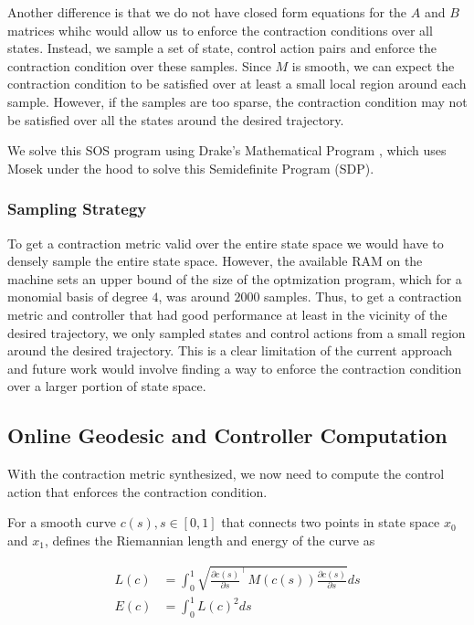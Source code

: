 \documentclass[conference]{IEEEtran}
\begin{document}
Another difference is that we do not have closed form equations for the $A$ and $B$ matrices whihc would allow us to enforce the contraction conditions over all states. Instead, we sample a set of state, control action pairs and enforce the contraction condition over these samples. Since $M$ is smooth, we can expect the contraction condition to be satisfied over at least a small local region around each sample. However, if the samples are too sparse, the contraction condition may not be satisfied over all the states around the desired trajectory.

We solve this SOS program using Drake's Mathematical Program \autocite{DrakeModelBasedDesign}, which uses Mosek under the hood to solve this Semidefinite Program (SDP).

\subsubsection{Sampling Strategy}
To get a contraction metric valid over the entire state space we would have to densely sample the entire state space. However, the available RAM on the machine sets an upper bound of the size of the optmization program, which for a monomial basis of degree $4$, was around $2000$ samples. Thus, to get a contraction metric and controller that had good performance at least in the vicinity of the desired trajectory, we only sampled states and control actions from a small region around the desired trajectory. This is a clear limitation of the current approach and future work would involve finding a way to enforce the contraction condition over a larger portion of state space.

\subsection{Online Geodesic and Controller Computation}
With the contraction metric synthesized, we now need to compute the control action that enforces the contraction condition.

For a smooth curve $c(s), s\in [0, 1]$ that connects two points in state space $x_0$ and $x_1$, \autocite{manchesterControlContractionMetrics2017} defines the Riemannian length and energy of the curve as

\begin{equation}
	\begin{aligned}
		L(c) &= \int_0^1 \sqrt{\frac{\partial{c(s)}}{\partial{s}} ^\top M(c(s)) \frac{\partial{c(s)}}{\partial{s}}} ds \\
		E(c) &= \int_0^1 L(c)^2 ds
	\end{aligned}
\end{equation}
\end{document}
